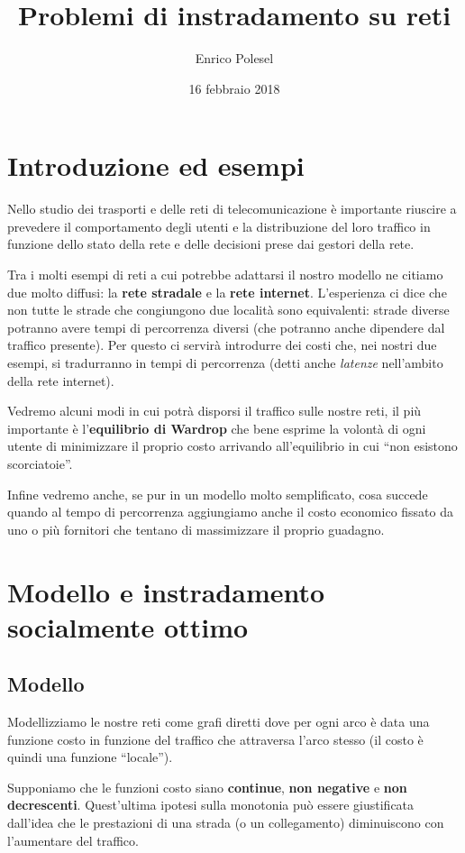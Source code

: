 \documentclass[a4paper]{article}
\title{Problemi di instradamento su reti}
\date{16 febbraio 2018}
\author{Enrico Polesel}
\theoremstyle{plain}
\theoremstyle{definition}
\theoremstyle{remark}
\begin{document}
\maketitle

\section{Introduzione ed esempi}

Nello studio dei trasporti e delle reti di telecomunicazione è
importante riuscire a prevedere il comportamento degli utenti e la
distribuzione del loro traffico in funzione dello stato della rete e
delle decisioni prese dai gestori della rete.

Tra i molti esempi di reti a cui potrebbe adattarsi il nostro modello
ne citiamo due molto diffusi: la \textbf{rete stradale} e la
\textbf{rete internet}. L'esperienza ci dice che non tutte le strade
che congiungono due località sono equivalenti: strade diverse potranno
avere tempi di percorrenza diversi (che potranno anche dipendere dal
traffico presente). Per questo ci servirà introdurre dei costi che,
nei nostri due esempi, si tradurranno in tempi di percorrenza (detti
anche \textit{latenze} nell'ambito della rete internet).

Vedremo alcuni modi in cui potrà disporsi il traffico sulle nostre
reti, il più importante è l'\textbf{equilibrio di Wardrop} che bene
esprime la volontà di ogni utente di minimizzare il proprio costo
arrivando all'equilibrio in cui ``non esistono scorciatoie''.

Infine vedremo anche, se pur in un modello molto semplificato, cosa
succede quando al tempo di percorrenza aggiungiamo anche il costo
economico fissato da uno o più fornitori che tentano di massimizzare
il proprio guadagno.

\section{Modello e instradamento socialmente ottimo}

\subsection{Modello}

Modellizziamo le nostre reti come grafi diretti dove per ogni arco è
data una funzione costo in funzione del traffico che attraversa l'arco
stesso (il costo è quindi una funzione ``locale'').

Supponiamo che le funzioni costo siano \textbf{continue}, \textbf{non
  negative} e \textbf{non decrescenti}. Quest'ultima ipotesi sulla
monotonia può essere giustificata dall'idea che le prestazioni di una
strada (o un collegamento) diminuiscono con l'aumentare del traffico.
\end{document}
